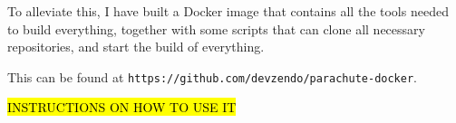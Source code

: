 \documentclass[a4paper]{tufte-book}
\begin{document}
To alleviate this, I have built a Docker image that contains all the tools needed to build everything, together with some scripts that can clone all necessary repositories, and start the build of everything.

This can be found at \verb|https://github.com/devzendo/parachute-docker|.

\hl{INSTRUCTIONS ON HOW TO USE IT}



\backmatter


\pagebreak



\printindex
\end{document}
